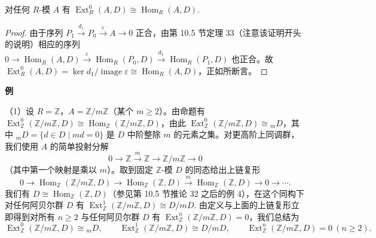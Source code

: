 \begin{proposition}\label{pro:17.3}
对任何 \(R\)-模 \(A\) 有 \(\operatorname{Ext}_R^0(A, D) \cong \operatorname{Hom}_R(A, D)\).
\end{proposition}

\begin{proof}
由于序列 \(P_1 \xrightarrow{d_1} P_0 \xrightarrow{\varepsilon} A \to 0\) 正合，由第 10.5 节定理 33（注意该证明开头的说明）相应的序列 \(0 \to \operatorname{Hom}_R(A, D) \xrightarrow{\varepsilon} \operatorname{Hom}_R(P_0, D) \xrightarrow{d_1} \operatorname{Hom}_R(P_1, D)\) 也正合。故 \(\operatorname{Ext}_R^0(A, D) = \ker d_1/\operatorname{image}\varepsilon \cong \operatorname{Hom}_R(A, D)\)，正如所断言。
\end{proof}

\noindent\textbf{例}

（1）设 \(R = \mathbb{Z}\)，\(A = \mathbb{Z}/m\mathbb{Z}\)（某个 \(m \geq 2\)）。由命题有 \(\operatorname{Ext}_{\mathbb{Z}}^0(\mathbb{Z}/m\mathbb{Z}, D) \cong \operatorname{Hom}_{\mathbb{Z}}(\mathbb{Z}/m\mathbb{Z}, D)\)，由此 \(\operatorname{Ext}_{\mathbb{Z}}^0(\mathbb{Z}/m\mathbb{Z}, D) \cong {}_mD\)，其中 \({}_mD = \{d \in D \mid md = 0\}\) 是 \(D\) 中阶整除 \(m\) 的元素之集。对更高阶上同调群，我们使用 \(A\) 的简单投射分解
\[
0 \to \mathbb{Z} \xrightarrow{m} \mathbb{Z} \to \mathbb{Z}/m\mathbb{Z} \to 0
\]
（其中第一个映射是乘以 \(m\)）。取到固定 \(\mathbb{Z}\)-模 \(D\) 的同态给出上链复形
\[
0 \to \operatorname{Hom}_{\mathbb{Z}}(\mathbb{Z}/m\mathbb{Z}, D) \to \operatorname{Hom}_{\mathbb{Z}}(\mathbb{Z}, D) \xrightarrow{m} \operatorname{Hom}_{\mathbb{Z}}(\mathbb{Z}, D) \to 0 \to \cdots.
\]
我们有 \(D \cong \operatorname{Hom}_{\mathbb{Z}}(\mathbb{Z}, D)\)（参见第 10.5 节推论 32 之后的例 4），在这个同构下对任何阿贝尔群 \(D\) 有 \(\operatorname{Ext}_{\mathbb{Z}}^1(\mathbb{Z}/m\mathbb{Z}, D) \cong D/mD\). 由定义与上面的上链复形立即得到对所有 \(n \geq 2\) 与任何阿贝尔群 \(D\) 有 \(\operatorname{Ext}_{\mathbb{Z}}^n(\mathbb{Z}/m\mathbb{Z}, D) = 0\)，我们总结为
\[
\operatorname{Ext}_{\mathbb{Z}}^0(\mathbb{Z}/m\mathbb{Z}, D) \cong {}_mD, \qquad \operatorname{Ext}_{\mathbb{Z}}^1(\mathbb{Z}/m\mathbb{Z}, D) \cong D/mD, \qquad \operatorname{Ext}_{\mathbb{Z}}^n(\mathbb{Z}/m\mathbb{Z}, D) = 0\ (n \geq 2).
\]

